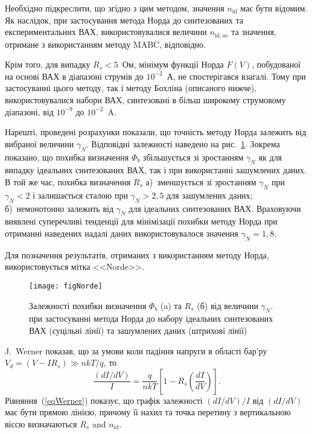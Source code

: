 Необхідно підкреслити, що згідно з цим методом, значення $n_\mathrm{id}$ має бути відомим.
Як наслідок, при застосування метода Норда до синтезованих та експериментальних ВАХ, використовувалися величини $n_{\mathrm{id},ac}$ та значення, отримане з використанням методу MABC, відповідно.

Крім того, для випадку  $R_s<5$~Ом, мінімум функції Норда $F(V)$, побудованої на основі ВАХ в діапазоні струмів до $10^{-2}$~А, не спостерігався взагалі.
Тому при застосуванні цього методу, так і методу Бохліна (описаного нижче), використовувалися набори ВАХ, синтезовані в більш широкому струмовому діапазоні, від $10^{-9}$ до $10^{-2}$~A.

Нарешті, проведені розрахунки показали, що точність методу Норда залежить від вибраної величини $\gamma_N$.
Відповідні залежності наведено на рис.~\ref{figNorde}.
Зокрема показано, що похибка визначення $\Phi_b$ збільшується зі зростанням $\gamma_N$ як для випадку ідеальних синтезованих ВАХ, так і при використанні зашумлених даних.
В той же час, похибка визначення  $R_s$
а)~зменшується зі зростанням $\gamma_N$ при $\gamma_N<2$ і залишається сталою при $\gamma_N>2,5$ для зашумлених даних;
б)~немонотонно залежить від $\gamma_N$ для ідеальних синтезованих ВАХ.
Враховуючи виявлені суперечливі тенденції для мінімізації похибки методу Норда при отриманні наведених надалі даних використовувалося значення $\gamma_N=1,8$.

Для позначення результатів, отриманих з використанням методу Норда, використовується мітка <<Norde>>.

\begin{figure}
\center
\texttt{[image: figNorde]}%
\caption{\label{figNorde}
Залежності похибки визначення $\Phi_b$ (a) та $R_s$ (б)  від величини $\gamma_N$.
 при застосуванні метода Норда до набору ідеальних синтезованих ВАХ (суцільні лінії) та зашумлених даних (штрихові лінії)
}
\end{figure}

J.~Werner  \cite{Werner} показав, що за умови коли падіння напруги в області бар'ру $V_d=(V-IR_s)\gg nkT/q$, то
\begin{equation}
\label{eqWerner}
\frac{(dI/dV)}{I}=\frac{q}{nkT}\left[1-R_s\left(\frac{dI}{dV}\right)\right].
\end{equation}
Рівняння~(\ref{eqWerner}) показує, що графік  залежності   $(dI/dV)/I$  від $(dI/dV)$ має бути прямою лінією,
причому її нахил та точка перетину з вертикальною віссю визначаються $R_s$ and $n_\mathrm{id}$.

